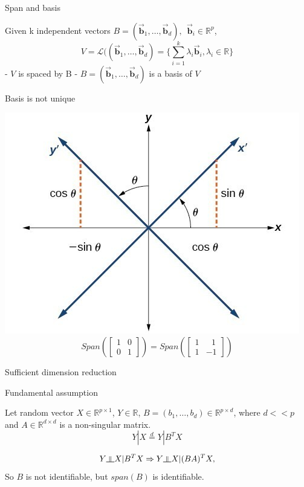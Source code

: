 \documentclass[ignorenonframetext,]{beamer}
\newcommand{\indep}{\rotatebox[origin=c]{90}{$\models$}}
\begin{document}
\begin{frame}{Span and basis}

Given k independent vectors
\(B = (\vec{\mathbf{b}}_1, \dots, \vec{\mathbf{b}}_d), ~~\vec{\mathbf{b}}_i \in \mathbb{R}^p\),
\[
V = \mathcal{L}((\vec{\mathbf{b}}_1, \dots, \vec{\mathbf{b}}_d) = \{\sum_{i = 1}^k\lambda_i\vec{\mathbf{b}}_i, \lambda_i\in \mathbb{R}\}
\] - \(V\) is spaced by B -
\(B = (\vec{\mathbf{b}}_1, \dots, \vec{\mathbf{b}}_d)\) is a basis of
\(V\)

\begin{block}{Basis is not unique}

\includegraphics{./pic/axes_rotatio.jpg} \[
  Span(\begin{bmatrix}
    1 & 0 \\
    0 & 1
  \end{bmatrix}) = Span(\begin{bmatrix}
    1 & ~~~1 \\
    1 & -1
  \end{bmatrix}) 
\]

\end{block}

\end{frame}

\begin{frame}{Sufficient dimension reduction}

\begin{block}{Fundamental assumption}

Let random vector \(X \in \mathbb{R}^{p \times 1}\),
\(Y \in \mathbb{R}\),
\(B = (b_1, \dots,b_d) \in \mathbb{R}^{p\times d}\), where \(d << p\)
and \(A \in \mathbb{R}^{d\times d}\) is a non-singular matrix. \[
Y|X \stackrel{d}{=} Y|B^T X
\]

\[
  Y \indep X|B^TX \Rightarrow Y \indep X|(BA)^TX, 
\] So \(B\) is not identifiable, but \(span(B)\) is identifiable.

\end{block}

\end{frame}
\end{document}

